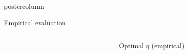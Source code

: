 \documentclass[final,hyperref={pdfpagelabels=false}]{beamer}
\begin{document}
\begin{frame}
\begin{columns}
\begin{column}{.49\textwidth}
\begin{beamercolorbox}[center,wd=\textwidth]{postercolumn}
\begin{minipage}[T]{.95\textwidth}
{\begin{block}{Empirical evaluation}
\begin{columns}
\begin{column}{.40\textwidth}
\begin{center}
\begin{figure}[h]
{  }
\setcounter{subfigure}{0}
\end{figure}
  \end{center}

   \end{column}
   \begin{column}{.25\textwidth}
   \begin{center}
  {\tiny Optimal $\eta$ (empirical)}
    \vspace{-0.5em}


\end{center}
\end{column}
\end{columns}
\end{block}}
\end{minipage}
\end{beamercolorbox}
\end{column}
\end{columns}
\end{frame}
\end{document}
